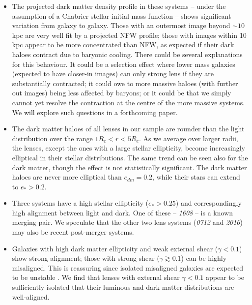 \documentclass[useAMS,usenatbib]{mn2e}
\begin{document}
\begin{itemize}
\item The projected dark matter density profile in these systems -- under the assumption of a Chabrier stellar initial mass function -- shows significant variation from galaxy to galaxy. Those with an outermost image beyond $\sim 10$\,kpc are very well fit by a projected NFW profile; those with images within 10\,kpc appear to be more concentrated than NFW, as expected if their dark haloes contract due to baryonic cooling. There could be several explanations for this behaviour. It could be a selection effect where lower mass galaxies (expected to have closer-in images) can only strong lens if they are substantially contracted; it could owe to more massive haloes (with further out images) being less affected by baryons; or it could be that we simply cannot yet resolve the contraction at the centre of the more massive systems. We will explore such questions in a forthcoming paper.

\item The dark matter haloes of all lenses in our sample are rounder than the light distribution over the range $1R_e < r < 5R_e$. As we average over larger radii, the lenses, except the ones with a large stellar ellipticity, become increasingly elliptical in their stellar distributions. The same trend can be seen also for the dark matter, though the effect is not statistically significant. The dark matter haloes are never more elliptical than $e_{dm} = 0.2$, while their stars can extend to $e_* > 0.2$.

\item Three systems have a high stellar ellipticity ($e_* > 0.25$) and correspondingly high alignment between light and dark. One of these -- {\it1608} -- is a known merging pair. We speculate that the other two lens systems ({\it0712} and {\it2016}) may also be recent post-merger systems. 

\item Galaxies with high dark matter ellipticity and weak external shear ($\gamma < 0.1$) show strong alignment; those with strong shear ($\gamma \gtrsim 0.1$) can be highly misaligned. This is reassuring since isolated misaligned galaxies are expected to be unstable \citep[e.g.][]{1979ApJ...233..872H,1988A&A...206..269M,2007ApJ...670.1027A,2015arXiv150203429D}. We find that lenses with external shear $\gamma < 0.1$ appear to be sufficiently isolated that their luminous and dark matter distributions are well-aligned.

\end{itemize}
\end{document}
